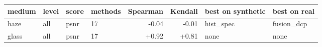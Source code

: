 \begin{tabular}{llllrrll}
\toprule
medium & level & score & methods & Spearman & Kendall & best on synthetic & best on real \\
\midrule
haze & all & psnr & 17 & -0.04 & -0.01 & hist\_spec & fusion\_dcp \\
glass & all & psnr & 17 & +0.92 & +0.81 & none & none \\
\bottomrule
\end{tabular}
